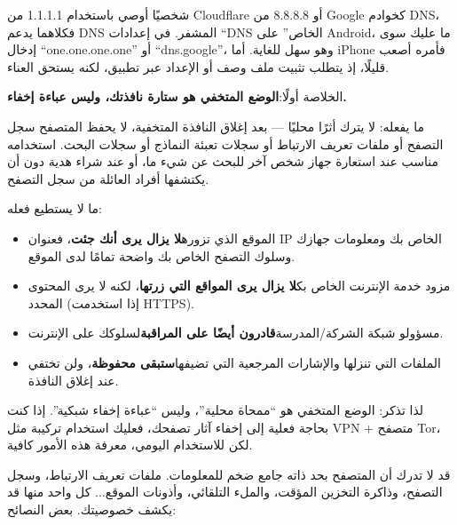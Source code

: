 شخصيًا أوصي باستخدام 1.1.1.1 من Cloudflare أو 8.8.8.8 من Google كخوادم DNS، فكلاهما يدعم DNS المشفر. في إعدادات “DNS الخاص” على Android، ما عليك سوى إدخال “one.one.one.one” أو “dns.google”، وهو سهل للغاية. أما iPhone فأمره أصعب قليلًا، إذ يتطلب تثبيت ملف وصف أو الإعداد عبر تطبيق، لكنه يستحق العناء.


الخلاصة أولًا:\textbf{الوضع المتخفي هو ستارة نافذتك، وليس عباءة إخفاء.}

ما يفعله: لا يترك أثرًا محليًا — بعد إغلاق النافذة المتخفية، لا يحفظ المتصفح سجل التصفح أو ملفات تعريف الارتباط أو سجلات تعبئة النماذج أو سجلات البحث. استخدامه مناسب عند استعارة جهاز شخص آخر للبحث عن شيء ما، أو عند شراء هدية دون أن يكتشفها أفراد العائلة من سجل التصفح.

ما لا يستطيع فعله:

\begin{itemize}
  \item الموقع الذي تزوره\textbf{لا يزال يرى أنك جئت}، فعنوان IP الخاص بك ومعلومات جهازك وسلوك التصفح الخاص بك واضحة تمامًا لدى الموقع.
  \item مزود خدمة الإنترنت الخاص بك\textbf{لا يزال يرى المواقع التي زرتها}، لكنه لا يرى المحتوى المحدد (إذا استخدمت HTTPS).
  \item مسؤولو شبكة الشركة/المدرسة\textbf{قادرون أيضًا على المراقبة}لسلوكك على الإنترنت.
  \item الملفات التي تنزلها والإشارات المرجعية التي تضيفها\textbf{ستبقى محفوظة}، ولن تختفي عند إغلاق النافذة.
\end{itemize}

لذا تذكر: الوضع المتخفي هو “ممحاة محلية”، وليس “عباءة إخفاء شبكية”. إذا كنت بحاجة فعلية إلى إخفاء آثار تصفحك، فعليك استخدام تركيبة مثل VPN + متصفح Tor، لكن للاستخدام اليومي، معرفة هذه الأمور كافية.


قد لا تدرك أن المتصفح بحد ذاته جامع ضخم للمعلومات. ملفات تعريف الارتباط، وسجل التصفح، وذاكرة التخزين المؤقت، والملء التلقائي، وأذونات الموقع... كل واحد منها قد يكشف خصوصيتك. بعض النصائح:

